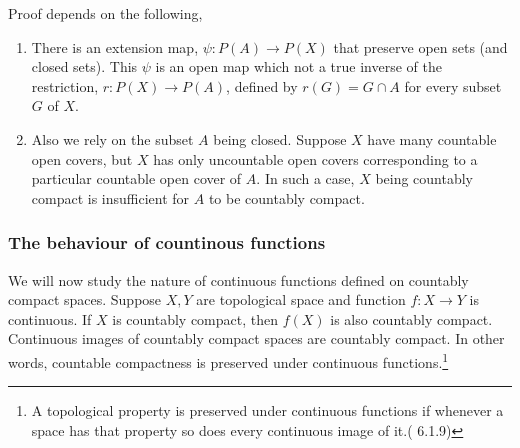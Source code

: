 \begin{remark}
	Proof depends on the following,
	\begin{enumerate}
		\item There is an extension map, $\psi : P(A) \to P(X)$ that preserve open sets (and closed sets). This $\psi$ is an open map which not a true inverse of the restriction, $r : P(X) \to P(A)$, defined by $r(G) = G \cap A$ for every subset $G$ of $X$.
		\item Also we rely on the subset $A$ being closed. Suppose $X$ have many countable open covers, but $X$ has only uncountable open covers corresponding to a particular countable open cover of $A$. In such a case, $X$ being countably compact is insufficient for $A$ to be countably compact.
	\end{enumerate}
\end{remark}

\subsubsection{The behaviour of countinous functions}
	We will now study the nature of continuous functions defined on countably compact spaces. Suppose $X,Y$ are topological space and function $f : X \to Y$ is continuous. If $X$ is countably compact, then $f(X)$ is also countably compact. Continuous images of countably compact spaces are countably compact. In other words, countable compactness is preserved under continuous functions.\footnote{A topological property is preserved under continuous functions if whenever a space has that property so does every continuous image of it.(\cite{joshi} 6.1.9)}
	
